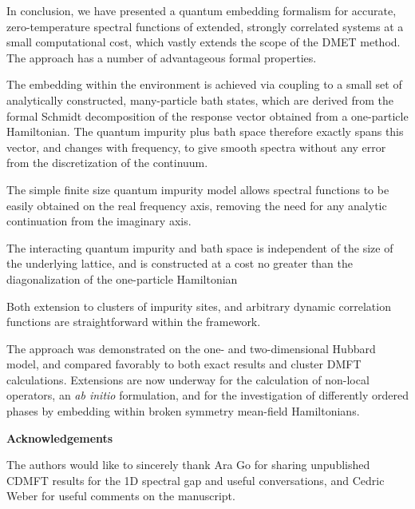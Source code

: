 \documentclass[aps,twocolumn,nobibnotes]{revtex4}
\begin{document}
In conclusion, we have presented a quantum embedding formalism for accurate, zero-temperature spectral functions of extended, strongly correlated systems 
at a small computational cost, which vastly 
extends the scope of the DMET method. The approach has a number of 
advantageous formal properties. 
\begin{inparaenum}
\item The embedding within the environment is achieved via coupling to a small set of analytically constructed, many-particle bath states,
    which are derived from the formal Schmidt decomposition of the response vector obtained from a one-particle Hamiltonian. The quantum impurity
    plus bath space therefore exactly spans this vector, and
    changes with frequency, to give smooth spectra without any error from the discretization of the continuum.
\item The simple finite size quantum impurity model allows spectral functions to be easily obtained on the real frequency axis, removing the 
    need for any analytic continuation from the imaginary axis.
\item The interacting quantum impurity and bath space is independent of the size of the underlying lattice, and is constructed at a cost no greater than the
    diagonalization of the one-particle Hamiltonian
\item Both extension to clusters of impurity sites, and arbitrary dynamic correlation functions are straightforward within the framework.
\end{inparaenum}
The approach was demonstrated on the one- and two-dimensional Hubbard model, and compared favorably to both exact results and cluster DMFT calculations. Extensions are now underway for the
calculation of non-local operators, an {\em ab initio} formulation, and for the investigation of differently ordered phases by embedding within broken symmetry mean-field Hamiltonians.

{\bf Acknowledgements}

The authors would like to sincerely thank Ara Go for sharing unpublished CDMFT results for the 1D spectral gap and useful 
conversations, and Cedric Weber for useful comments on the manuscript.


\end{document}

